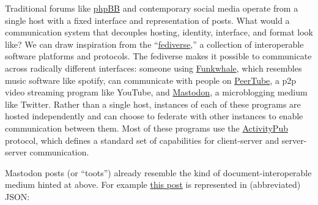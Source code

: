Traditional forums like \href{https://www.phpbb.com/}{phpBB} and
contemporary social media operate from a single host with a fixed
interface and representation of posts. What would a communication system
that decouples hosting, identity, interface, and format look like? We
can draw inspiration from the
``\href{https://en.wikipedia.org/wiki/Fediverse}{fediverse},'' a
collection of interoperable software platforms and protocols. The
fediverse makes it possible to communicate across radically different
interfaces: someone using \href{https://funkwhale.audio/}{Funkwhale},
which resembles music software like spotify, can communicate with people
on \href{https://joinpeertube.org/}{PeerTube}, a p2p video streaming
program like YouTube, and \href{https://joinmastodon.org/}{Mastodon}, a
microblogging medium like Twitter. Rather than a single host, instances
of each of these programs are hosted independently and can choose to
federate with other instances to enable communication between them. Most
of these programs use the
\href{https://www.w3.org/TR/2018/REC-activitypub-20180123/}{ActivityPub}
\citep{Webber:18:A}  protocol, which defines a standard set of
capabilities for client-server and server-server communication.

Mastodon posts (or ``toots'') already resemble the kind of
document-interoperable medium hinted at above. For example
\href{https://web.archive.org/web/20220708215201/https://social.coop/@jonny/107328829457619549}{this
post} is represented in (abbreviated) JSON:

